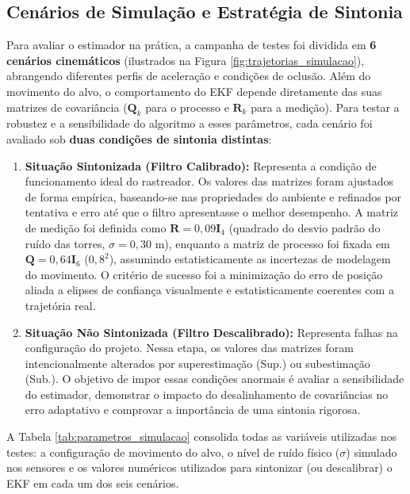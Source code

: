 \subsection{Cenários de Simulação e Estratégia de Sintonia}
\label{subsec:cenarios_sintonia}

Para avaliar o estimador na prática, a campanha de testes foi dividida em \textbf{6 cenários cinemáticos} (ilustrados na Figura \ref{fig:trajetorias_simulacao}), abrangendo diferentes perfis de aceleração e condições de oclusão. Além do movimento do alvo, o comportamento do EKF depende diretamente das suas matrizes de covariância ($\mathbf{Q}_k$ para o processo e $\mathbf{R}_k$ para a medição). Para testar a robustez e a sensibilidade do algoritmo a esses parâmetros, cada cenário foi avaliado sob \textbf{duas condições de sintonia distintas}:

\begin{enumerate}
    \item \textbf{Situação Sintonizada (Filtro Calibrado):} Representa a condição de funcionamento ideal do rastreador. Os valores das matrizes foram ajustados de forma empírica, baseando-se nas propriedades do ambiente e refinados por tentativa e erro até que o filtro apresentasse o melhor desempenho. A matriz de medição foi definida como $\mathbf{R} = 0,09\mathbf{I}_4$ (quadrado do desvio padrão do ruído das torres, $\sigma = 0,30$ m), enquanto a matriz de processo foi fixada em $\mathbf{Q} = 0,64\mathbf{I}_6$ ($0,8^2$), assumindo estatisticamente as incertezas de modelagem do movimento. O critério de sucesso foi a minimização do erro de posição aliada a elipses de confiança visualmente e estatisticamente coerentes com a trajetória real.
    
    \item \textbf{Situação Não Sintonizada (Filtro Descalibrado):} Representa falhas na configuração do projeto. Nessa etapa, os valores das matrizes foram intencionalmente alterados por superestimação (Sup.) ou subestimação (Sub.). O objetivo de impor essas condições anormais é avaliar a sensibilidade do estimador, demonstrar o impacto do desalinhamento de covariâncias no erro adaptativo e comprovar a importância de uma sintonia rigorosa.
\end{enumerate}

A Tabela \ref{tab:parametros_simulacao} consolida todas as variáveis utilizadas nos testes: a configuração de movimento do alvo, o nível de ruído físico ($\sigma$) simulado nos sensores e os valores numéricos utilizados para sintonizar (ou descalibrar) o EKF em cada um dos seis cenários.

